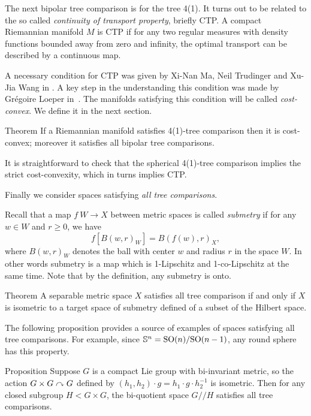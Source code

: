 The next bipolar tree comparison is for the tree 4(1).
It turns out to be related to the  so called \emph{continuity of transport property}, briefly CTP.
A compact Riemannian manifold $M$ is CTP 
if for any two regular measures with density functions bounded away from zero and infinity,
the optimal transport can be described by a continuous map.



A necessary condition for CTP was given by Xi-Nan Ma, Neil Trudinger and Xu-Jia Wang in \cite{MTW}.
A key step in the understanding this condition was made by Grégoire Loeper in~\cite{loeper}.
The manifolds satisfying this condition will be called \emph{cost-convex}.
We define it in the next section.

\begin{thm}{Theorem}\label{T=>CTIL:CTIL}
If a Riemannian manifold satisfies 4(1)-tree comparison then it is cost-convex; moreover it satisfies all bipolar tree comparisons.
\end{thm}

It is straightforward to check that the spherical 4(1)-tree comparison implies the strict cost-convexity, which in turns implies CTP.

Finally we consider spaces satisfying \emph{all tree comparisons}.

Recall that a map $f\:W\to X$ between metric spaces is called \emph{submetry} if for any $w\in W$ and $r\ge 0$, we have 
\[f[B(w,r)_W]=B(f(w),r)_X,\]
where $B(w,r)_W$ denotes the ball with center $w$ and radius $r$ in the space $W$.
In other words submetry is a map which is 1-Lipschitz and 1-co-Lipschitz at the same time.
Note that by the definition, any submetry is onto.

\begin{thm}{Theorem}\label{thm:hilbert-quotient}
A separable metric space $X$ satisfies all tree comparison if and only if
$X$ is isometric to a target space of submetry defined of a subset  of the Hilbert space.
\end{thm}

The following proposition provides a source of examples of spaces satisfying all tree comparisons.
For example, since $\mathbb{S}^n=\mathrm{SO}(n)/\mathrm{SO}(n-1)$, any round sphere has this property.

\begin{thm}{Proposition}\label{prop:group}
Suppose $G$ is a compact Lie group with bi-invariant metric, so the action $G\times G\curvearrowright G$ defined by $(h_1,h_2)\cdot g=h_1\cdot g\cdot  h_2^{-1}$ is isometric. 
Then for any closed subgroup $H<G\times G$, the bi-quotient space $G/\!\!/H$ satisfies all tree comparisons.
\end{thm}

